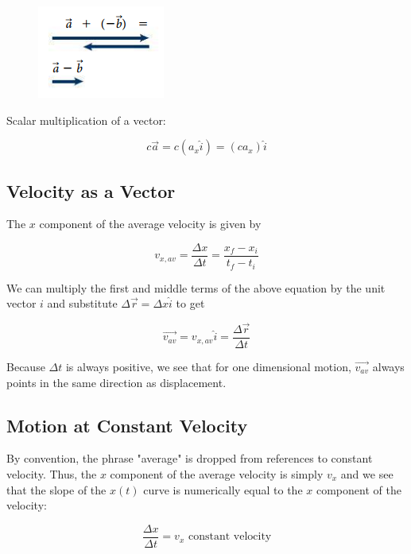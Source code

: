         \begin{figure}[hbt!]
            \centering
            \includegraphics[scale=0.75]{Resources/Vector_Subtraction}
        \end{figure}

        \noindent Scalar multiplication of a vector:

        \[
            c\overrightarrow{a} = c\left(a_x \hat{i}\right) = \left(ca_x\right)\hat{i}
        \]



    \pagebreak
    \subsection{Velocity as a Vector}
        The $x$ component of the average velocity is given by

        \[
            v_{x,av} = \frac{\Delta x}{\Delta t} = \frac{x_f - x_i}{t_f - t_i}
        \]

        \noindent We can multiply the first and middle terms of the above equation by the unit vector $i$ and substitute $\Delta \overrightarrow{r} = \Delta x \hat{i}$ to get

        \[
            \overrightarrow{v_{av}} = v_{x,av}\hat{i} = \frac{\Delta \overrightarrow{r}}{\Delta t}
        \]

        \noindent Because $\Delta t$ is always positive, we see that for one dimensional motion, $\overrightarrow{v_{av}}$ always points in the same direction as displacement.



    \subsection{Motion at Constant Velocity}
        By convention, the phrase "average" is dropped from references to constant velocity. Thus, the $x$ component of the average velocity is simply $v_x$ and we see that the slope of the $x(t)$ curve is numerically
        equal to the $x$ component of the velocity:

        \[
            \frac{\Delta x}{\Delta t} = v_x \text{ constant velocity}
        \]

